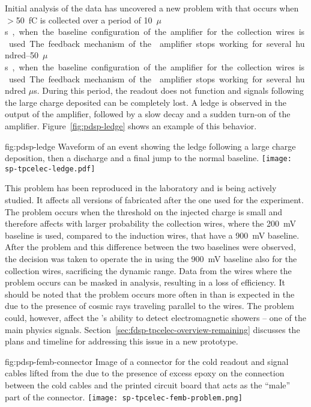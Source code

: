 Initial analysis of the  data has uncovered a new problem with  
that occurs when $>$\SI{50}{fC} is collected over a period of \SIrange{10}{50}{$\mu$s}, 
when the baseline configuration of the amplifier for the collection wires is used. 
The feedback mechanism of the  amplifier stops working for several 
hundred $\mu$s. During this period, the readout does not function and signals 
following the large charge deposited can be completely lost. A ledge is observed 
in the output of the  amplifier, followed by a slow decay 
and a sudden turn-on of the amplifier.
Figure~\ref{fig:pdsp-ledge} shows an example of this behavior.

\begin{dunefigure}
{fig:pdsp-ledge}
{Waveform of an event showing the ledge following a large charge 
deposition, then a discharge and a final jump to the normal baseline.}
\texttt{[image: sp-tpcelec-ledge.pdf]}
\end{dunefigure}

This problem has been reproduced in the laboratory and is being actively 
studied. It affects all versions of  fabricated after 
the one used for the  experiment. The problem occurs 
when the threshold on the injected charge is small and therefore affects
with larger probability the collection wires, where the \SI{200}{mV} baseline 
is used, compared to the induction wires, that have a \SI{900}{mV} baseline.
After the problem and this difference between the two baselines were 
observed, the decision was taken to operate the  in  
using the \SI{900}{mV} baseline also for the collection wires, sacrificing
the dynamic range. Data from the wires where the problem occurs can
be masked in analysis, resulting in a loss of efficiency. It should be
noted that the problem occurs more often in  
than is expected in the    due to the presence of 
cosmic rays traveling parallel to the  wires.
The problem could, however, affect the 's ability to detect
electromagnetic showers -- one of the main physics signals.
Section~\ref{sec:fdsp-tpcelec-overview-remaining} discusses the plans and timeline 
for addressing this issue in a new  prototype.

\begin{dunefigure}
{fig:pdsp-femb-connector}
{Image of a connector for the cold readout and signal cables lifted from
the  due to the presence of excess epoxy on the 
connection between the cold cables and the printed circuit board
that acts as the ``male'' part of the connector.}
\texttt{[image: sp-tpcelec-femb-problem.png]}
\end{dunefigure}

